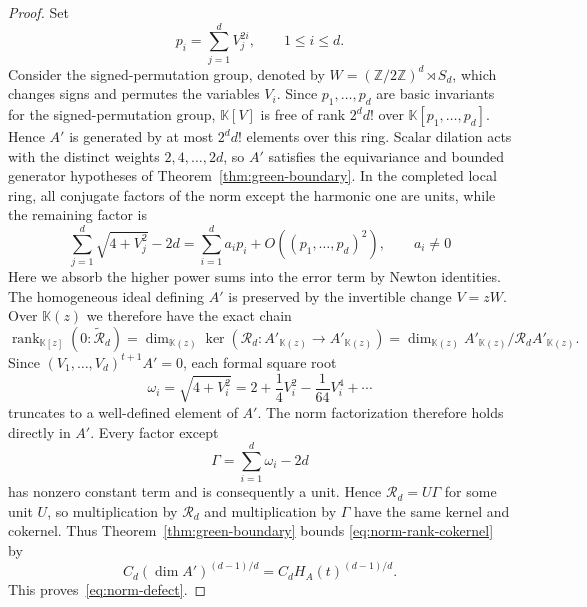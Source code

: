 \documentclass[10pt,a4paper]{amsart}
\newcommand\K{\ensuremath{\mathbb{K}}}
\begin{document}
\begin{proof}
Set
\[
 p_i=\sum_{j=1}^dV_j^{2i},\qquad 1\le i\le d.
\]
Consider the signed-permutation group, denoted by $W=(\mathbb Z/2\mathbb Z)^d\rtimes S_d$, which changes signs and
permutes the variables $V_i$. Since $p_1,\ldots,p_d$ are basic invariants for the signed-permutation
group, $\mathbb K[V]$ is free of rank $2^d d!$ over
$\mathbb K[p_1,\ldots,p_d]$. Hence $A'$ is generated by at most
$2^d d!$ elements over this ring.
Scalar dilation acts with the distinct
weights $2,4,\ldots,2d$, so $A'$ satisfies the equivariance and bounded
generator hypotheses of Theorem~\ref{thm:green-boundary}.  In the completed
local ring, all conjugate factors of the norm except the harmonic one are
units, while the remaining factor is
\begin{equation}\label{eq:norm-linearization}
 \sum_{j=1}^d\sqrt{4+V_j^2}-2d
   =\sum_{i=1}^da_ip_i+O((p_1,\ldots,p_d)^2),
 \qquad a_i\ne0
\end{equation}
Here we absorb the higher power sums into the error term by Newton identities.
The homogeneous ideal defining $A'$ is preserved by the invertible change
$V=zW$.  Over $\K(z)$ we therefore have the exact chain
\begin{equation}\label{eq:norm-rank-cokernel}
 \operatorname{rank}_{\K[z]}(0:\widetilde{\mathcal R}_d)
 =\dim_{\K(z)}\ker(\mathcal R_d:A'_{\K(z)}\to A'_{\K(z)})
 =\dim_{\K(z)}A'_{\K(z)}/\mathcal R_dA'_{\K(z)}.
\end{equation}
Since $(V_1,\ldots,V_d)^{t+1}A'=0$, each formal square root
\begin{equation*}
    \omega_i=\sqrt{4+V_i^2}
    =2+\frac14V_i^2-\frac1{64}V_i^4+\cdots
\end{equation*}
truncates to a well-defined element of $A'$. The norm factorization
therefore holds directly in $A'$. Every factor except
\begin{equation*}
    \Gamma=\sum_{i=1}^d\omega_i-2d
\end{equation*}
has nonzero constant term and is consequently a unit. Hence
$\mathcal R_d=U\Gamma$ for some unit $U$, so multiplication by
$\mathcal R_d$ and multiplication by $\Gamma$ have the same kernel and
cokernel. Thus Theorem~\ref{thm:green-boundary}
bounds \eqref{eq:norm-rank-cokernel} by
\begin{equation*}
    C_d(\dim A')^{(d-1)/d}=C_dH_A(t)^{(d-1)/d}.
\end{equation*}
This proves~\eqref{eq:norm-defect}.
\end{proof}
\end{document}
